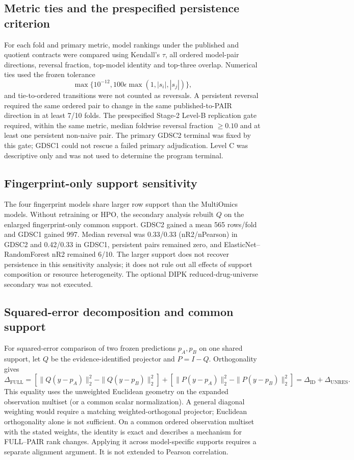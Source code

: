 \documentclass[11pt]{article}
\begin{document}
\subsection{Metric ties and the prespecified persistence criterion}
For each fold and primary metric, model rankings under the published and quotient contracts were compared using Kendall's $\tau$, all ordered model-pair directions, reversal fraction, top-model identity and top-three overlap. Numerical ties used the frozen tolerance
\[
\max\{10^{-12},100\epsilon\max(1,|s_i|,|s_j|)\},
\]
and tie-to-ordered transitions were not counted as reversals. A persistent reversal required the same ordered pair to change in the same published-to-PAIR direction in at least 7/10 folds. The prespecified Stage-2 Level-B replication gate required, within the same metric, median foldwise reversal fraction $\ge0.10$ and at least one persistent non-naive pair. The primary GDSC2 terminal was fixed by this gate; GDSC1 could not rescue a failed primary adjudication. Level C was descriptive only and was not used to determine the program terminal.


\subsection{Fingerprint-only support sensitivity}
The four fingerprint models share larger row support than the MultiOmics models. Without retraining or HPO, the secondary analysis rebuilt $Q$ on the enlarged fingerprint-only common support. GDSC2 gained a mean 565 rows/fold and GDSC1 gained 997. Median reversal was 0.33/0.33 (nR2/nPearson) in GDSC2 and 0.42/0.33 in GDSC1, persistent pairs remained zero, and ElasticNet--RandomForest nR2 remained 6/10. The larger support does not recover persistence in this sensitivity analysis; it does not rule out all effects of support composition or resource heterogeneity. The optional DIPK reduced-drug-universe secondary was not executed.


\subsection{Squared-error decomposition and common support}
For squared-error comparison of two frozen predictions $p_A,p_B$ on one shared support, let $Q$ be the evidence-identified projector and $P=I-Q$. Orthogonality gives
\[
\Delta_{\mathrm{FULL}}
=
\left[\|Q(y-p_A)\|_2^2-\|Q(y-p_B)\|_2^2\right]
+
\left[\|P(y-p_A)\|_2^2-\|P(y-p_B)\|_2^2\right]
=
\Delta_{\mathrm{ID}}+\Delta_{\mathrm{UNRES}}.
\]
This equality uses the unweighted Euclidean geometry on the expanded observation multiset (or a common scalar normalization). A general diagonal weighting would require a matching weighted-orthogonal projector; Euclidean orthogonality alone is not sufficient. On a common ordered observation multiset with the stated weights, the identity is exact and describes a mechanism for FULL--PAIR rank changes. Applying it across model-specific supports requires a separate alignment argument. It is not extended to Pearson correlation.
\end{document}

